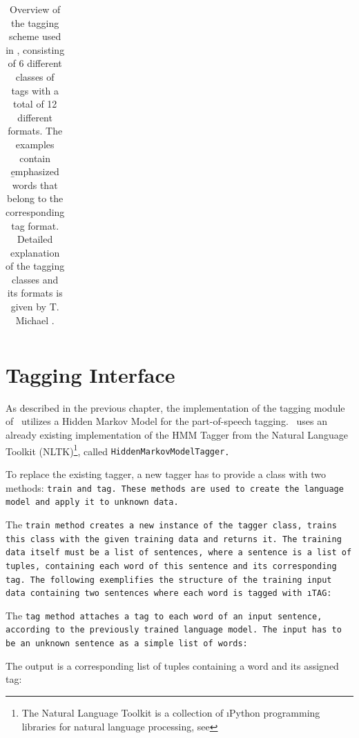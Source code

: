 \begin{table}[H]
\begin{tabular}{ p{2mm} L{48mm} p{35mm} p{40mm} }
	\bottomrule
	\end{tabular}
	\caption[Tagging Scheme Overview]{Overview of the tagging scheme used in \Alex, consisting of 6 different classes of tags with a total of 12 different formats. The examples contain \b{emphasized} words that belong to the corresponding tag format. Detailed explanation of the tagging classes and its formats is given by T. Michael \cite{michael2016}.}
	\label{t.tagging_scheme}
	\vspace{1ex}
\end{table}

\section{Tagging Interface}\label{c.alex.tagging}
As described in the previous chapter, the implementation of the tagging module of \Alex\ utilizes a Hidden Markov Model for the part-of-speech tagging. \Alex\ uses an already existing implementation of the HMM Tagger from the Natural Language Toolkit (NLTK)\footnote{The Natural Language Toolkit is a collection of \i{Python} programming libraries for natural language processing, see }, called \tt{HiddenMarkovModelTagger}.

To replace the existing tagger, a new tagger has to provide a class with two methods: \tt{train} and \tt{tag}. These methods are used to create the language model and apply it to unknown data.

The \tt{train} method creates a new instance of the tagger class, trains this class with the given training data and returns it. The training data itself must be a list of sentences, where a sentence is a list of tuples, containing each word of this sentence and its corresponding tag. The following exemplifies the structure of the training input data containing two sentences where each word is tagged with \i{TAG}:



The \tt{tag} method attaches a tag to each word of an input sentence, according to the previously trained language model. The input has to be an unknown sentence as a simple list of words:



The output is a corresponding list of tuples containing a word and its assigned tag:




